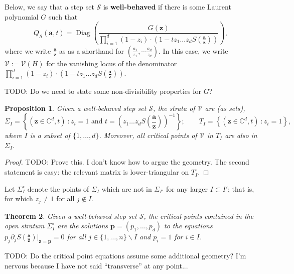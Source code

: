 \documentclass[A4,12pt]{article}
\newcommand{\<}{\left\langle}
\renewcommand{\>}{\right\rangle}
\newcommand{\steps}{\mathcal{S}}
\newcommand{\variety}{\mathcal{V}}
\newcommand{\z}{\mathbf{z}}
\renewcommand{\a}{\mathbf{a}}
\DeclareMathOperator{\Diag}{Diag}
\newcommand{\ts}{\textstyle}
\newtheorem{theorem}{Theorem}
\newtheorem{proposition}[theorem]{Proposition}
\theoremstyle{definition}
\theoremstyle{example}
\begin{document}
Below, we say that a step set $\steps$ is \textbf{well-behaved} if there is some Laurent polynomial $G$ such that
$$ Q_\steps(\a,t) = \Diag\left(\frac{G(\z)}{\prod_{i=1}^d (1-z_i) \cdot \left(1-tz_1\dots z_d S(\frac{\a}{\z}) \right)}\right), $$
where we write $\frac{\a}{\z}$ as as a shorthand for $(\frac{a_1}{z_1},\cdots\frac{a_d}{z_d})$. In this case, we write $\variety:=\variety(H)$ for the vanishing locus of the denominator $\prod_{i=1}^d (1-z_i) \cdot \left(1-tz_1\dots z_d S(\frac{\a}{\z}) \right)$.

TODO: Do we need to state some non-divisibility properties for $G$?

\begin{proposition}
Given a well-behaved step set $\steps$, the strata of $\variety$ are (as sets),
$$\Sigma_I = \left\{(\z\in\mathbb{C}^d,t)\ : z_i=1 \text{ and } t=\left(z_1\dots z_d S({\ts\frac{\a}{\z}})\right)^{-1} \right\}; \qquad T_I = \left\{(\z\in\mathbb{C}^d,t)\ : z_i=1 \right\}, $$
where $I$ is a subset of $\{1,\dots, d\}$. Moreover, all critical points of $\variety$ in $T_I$ are also in $\Sigma_I$.
\end{proposition}

\begin{proof}
TODO: Prove this. I don't know how to argue the geometry. The second statement is easy: the relevant matrix is lower-triangular on $T_I^\circ$.
\end{proof}

Let $\Sigma_I^\circ$ denote the points of $\Sigma_I$ which are not in $\Sigma_{I'}$ for any larger $I\subset I'$; that is, for which $z_j\neq 1$ for all $j\notin I$. 

\begin{theorem}
\label{thm:well-behaved-critical}
Given a well-behaved step set $\steps$, the critical points contained in the open stratum $\Sigma_I^\circ$ are the solutions $\mathbf{p}=(p_1,\dots, p_d)$ to the equations $p_j \partial_j S({\ts\frac{\a}{\z}})\Big\vert_{\z=\mathbf{p}}=0$ for all $j\in\{1,\dots,n\}\smallsetminus I$ and $p_i=1$ for $i\in I$.
\end{theorem}

TODO: Do the critical point equations assume some additional geometry? I'm nervous because I have not said ``transverse'' at any point...
\end{document}
